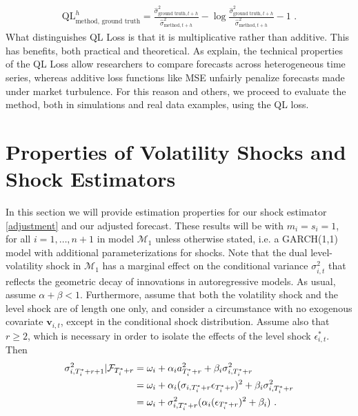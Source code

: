\documentclass{uiucthesis2021}
\newcommand{\x}{\textbf{v}}
\def\mc#1{\mathcal{#1}} %
\def\mc#1{\mathcal{#1}}
\theoremstyle{definition}
\begin{document}
\begin{align*}
\text{QL}^{h}_{\text{method, ground truth}} = \frac{\hat\sigma^{2}_{\text{ground truth},t+h}}{ \hat\sigma^{2}_{\text{method},t+h}} - \log{\frac{\hat\sigma^{2}_{\text{ground truth},t+h}}{ \hat\sigma^{2}_{\text{method},t+h}}} -1 \text{ .}
\end{align*}
What distinguishes QL Loss is that it is multiplicative rather than additive.  This has benefits, both practical and theoretical.  As \cite[][]{brownlees2011practical} explain, the technical properties of the QL Loss allow researchers to compare forecasts across heterogeneous time series, whereas additive loss functions like MSE unfairly penalize forecasts made under market turbulence.  For this reason and others, we proceed to evaluate the method, both in simulations and real data examples, using the QL loss.

\section{Properties of Volatility Shocks and Shock Estimators}\label{SVF_properties}

In this section we will provide estimation properties for our shock  estimator \eqref{adjustment} and our adjusted forecast. These results will be with $m_i = s_i = 1$, for all $i = 1,\ldots,n+1$ in model $\mc{M}_1$ unless otherwise stated, i.e. a GARCH(1,1) model with additional parameterizations for shocks. Note that the dual level-volatility shock in $\mc{M}_1$ has a marginal effect on the conditional variance $\sigma^{2}_{i,t}$ that reflects the geometric decay of innovations in autoregressive models.  As usual, assume $\alpha+\beta < 1$.  Furthermore, assume that both the volatility shock and the level shock are of length one only, and consider a circumstance with no exogenous covariate $\x_{i,t}$, except in the conditional shock distribution. Assume also that $r\geq 2$, which is necessary in order to isolate the effects of the level shock $\epsilon^{*}_{i,t}$.  Then
\begin{align}
\sigma^{2}_{i,T_{i}^{*}+r+1} | \mathcal{F}_{T_{i}^{*}+r} & = \omega_{i} + \alpha_{i} a_{T_{i}^{*}+r}^{2} + \beta_{i}\sigma^{2}_{i,T_{i}^{*}+r} \label{eq0}\\
& = \omega_{i} + \alpha_{i}(\sigma_{i,T_{i}^{*}+r}\epsilon_{T_{i}^{*}+r})^{2} + \beta_{i}\sigma^{2}_{i,T_{i}^{*}+r}\notag \\
& = \omega_{i} + \sigma^{2}_{i,T_{i}^{*}+r}(\alpha_{i} (\epsilon_{T_{i}^{*}+r})^{2} + \beta_{i}) \text{ .}\notag 
\end{align}
\end{document}

